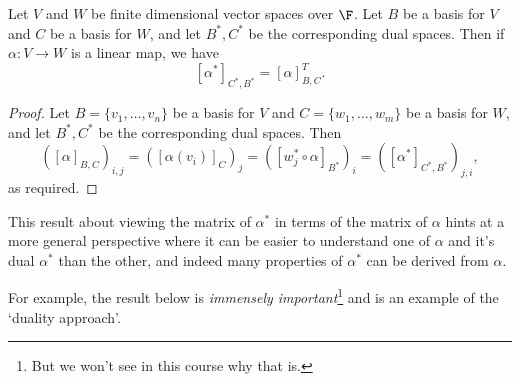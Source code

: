 \begin{theorem}
    Let $V$ and $W$ be finite dimensional vector spaces over $\F$. Let $B$ be a basis for $V$ and $C$ be a basis for $W$, and let $B^*, C^*$ be the corresponding dual spaces.
    Then if $\alpha: V \rightarrow W$ is a linear map, we have
    $$
    [\alpha^*]_{C^*, B^*} = [\alpha]_{B, C}^T.
    $$
\end{theorem}
\begin{proof}
    Let $B = \{v_1, \dots, v_n\}$ be a basis for $V$ and $C = \{w_1, \dots, w_m\}$ be a basis for $W$, and let $B^*, C^*$ be the corresponding dual spaces. Then 
    $$
    ([\alpha]_{B, C})_{i, j} = ([\alpha(v_i)]_{C})_j = ([w_j^* \circ \alpha]_{B^*})_i = ([\alpha^*]_{C^*, B^*})_{j, i},
    $$
    as required.
\end{proof}

This result about viewing the matrix of $\alpha^*$ in terms of the matrix of $\alpha$ hints at a more general perspective where it can be easier to understand one of $\alpha$ and it's dual $\alpha^*$ than the other, and indeed many properties of $\alpha^*$ can be derived from $\alpha$. 

For example, the result below is \emph{immensely important}\footnote{But we won't see in this course why that is.} and is an example of the `duality approach'. 

